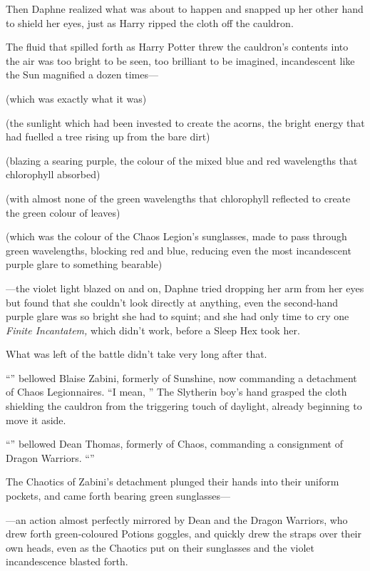 Then Daphne realized what was about to happen and snapped up her other hand to shield her eyes, just as Harry ripped the cloth off the cauldron.

The fluid that spilled forth as Harry Potter threw the cauldron’s contents into the air was too bright to be seen, too brilliant to be imagined, incandescent like the Sun magnified a dozen times—

(which was exactly what it was)

(the sunlight which had been invested to create the acorns, the bright energy that had fuelled a tree rising up from the bare dirt)

(blazing a searing purple, the colour of the mixed blue and red wavelengths that chlorophyll absorbed)

(with almost none of the green wavelengths that chlorophyll reflected to create the green colour of leaves)

(which was the colour of the Chaos Legion’s sunglasses, made to pass through green wavelengths, blocking red and blue, reducing even the most incandescent purple glare to something bearable)

—the violet light blazed on and on, Daphne tried dropping her arm from her eyes but found that she couldn’t look directly at anything, even the second-hand purple glare was so bright she had to squint; and she had only time to cry one \emph{Finite Incantatem,} which didn’t work, before a Sleep Hex took her.

What was left of the battle didn’t take very long after that.

\later

“” bellowed Blaise Zabini, formerly of Sunshine, now commanding a detachment of Chaos Legionnaires. “I mean, ” The Slytherin boy’s hand grasped the cloth shielding the cauldron from the triggering touch of daylight, already beginning to move it aside.

“” bellowed Dean Thomas, formerly of Chaos, commanding a consignment of Dragon Warriors. “”

The Chaotics of Zabini’s detachment plunged their hands into their uniform pockets, and came forth bearing green sunglasses—

—an action almost perfectly mirrored by Dean and the Dragon Warriors, who drew forth green-coloured Potions goggles, and quickly drew the straps over their own heads, even as the Chaotics put on their sunglasses and the violet incandescence blasted forth.

